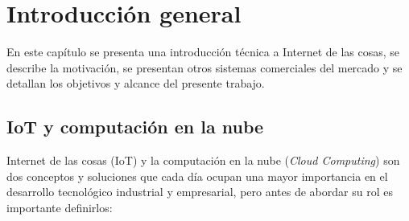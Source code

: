 
\chapter{Introducción general} %

\label{Chapter1} %
\label{IntroGeneral}
En este capítulo se presenta una introducción técnica a Internet de las cosas, se describe la motivación, se presentan otros sistemas comerciales del mercado y se detallan los objetivos y alcance del presente trabajo.

\newcommand{\keyword}[1]{\textbf{#1}}
\newcommand{\tabhead}[1]{\textbf{#1}}
\newcommand{\code}[1]{\texttt{#1}}
\newcommand{\file}[1]{\texttt{\bfseries#1}}
\newcommand{\option}[1]{\texttt{\itshape#1}}
\newcommand{\grados}{$^{\circ}$}






\section{IoT y computación en la nube}

Internet de las cosas (IoT) y la computación en la nube (\emph{Cloud Computing}) son dos conceptos y soluciones que cada día ocupan una mayor importancia en el desarrollo tecnológico industrial y empresarial, pero antes de abordar su rol es importante definirlos:

